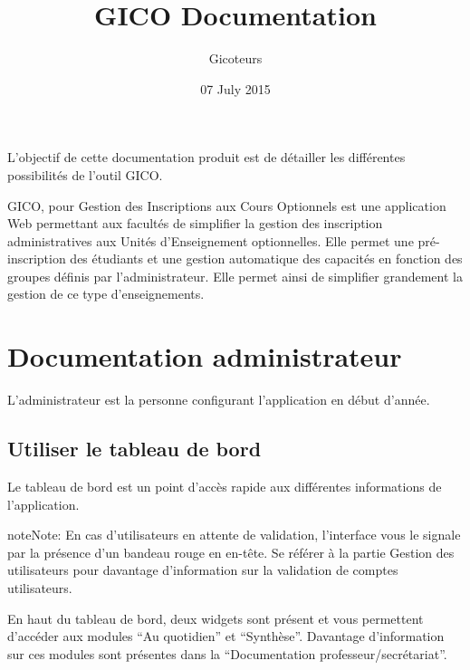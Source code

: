 \documentclass[letterpaper,10pt,french]{sphinxmanual}
\title{GICO Documentation}
\date{07 July 2015}
\author{Gicoteurs}
\begin{document}
\maketitle
\tableofcontents
{}\label{index::doc}


L'objectif de cette documentation produit est de détailler les différentes possibilités de l'outil GICO.

GICO, pour Gestion des Inscriptions aux Cours Optionnels est une application Web permettant aux facultés de simplifier la gestion des inscription administratives aux Unités d'Enseignement optionnelles. Elle permet une pré-inscription des étudiants et une gestion automatique des capacités en fonction des groupes définis par l'administrateur. Elle permet ainsi de simplifier grandement la gestion de ce type d'enseignements.


\chapter{Documentation administrateur}
\label{index:documentation-administrateur}\label{index:documentation-du-projet-gico}
L'administrateur est la personne configurant l'application en début d'année.


\section{Utiliser le tableau de bord}
\label{admin::doc}\label{admin:utiliser-le-tableau-de-bord}
Le tableau de bord est un point d'accès rapide aux différentes informations de l'application.

\begin{notice}{note}{Note:}
En cas d'utilisateurs en attente de validation, l'interface vous le signale par la présence d'un bandeau rouge en en-tête. Se référer à la partie Gestion des utilisateurs pour davantage d'information sur la validation de comptes utilisateurs.
\end{notice}

En haut du tableau de bord, deux widgets sont présent et vous permettent d'accéder aux modules ``Au quotidien'' et ``Synthèse''. Davantage d'information sur ces modules sont présentes dans la ``Documentation professeur/secrétariat''.
\end{document}
